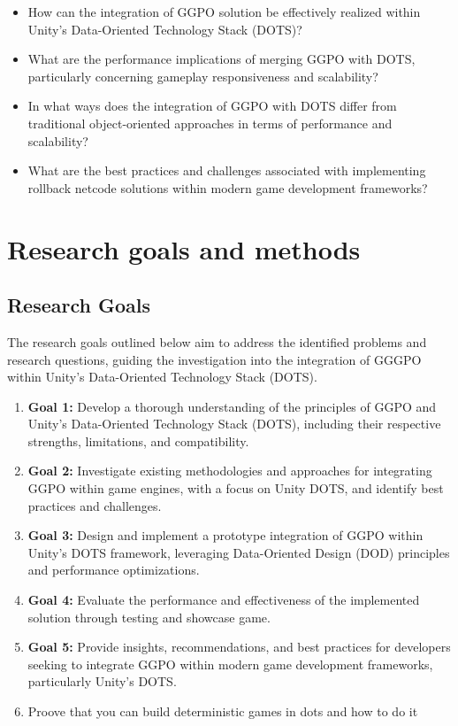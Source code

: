 \begin{itemize}
\item How can the integration of GGPO solution be effectively realized within Unity's Data-Oriented Technology Stack (DOTS)?
\item What are the performance implications of merging GGPO with DOTS, particularly concerning gameplay responsiveness and scalability?
\item In what ways does the integration of GGPO with DOTS differ from traditional object-oriented approaches in terms of performance and scalability?
\item What are the best practices and challenges associated with implementing rollback netcode solutions within modern game development frameworks?
\end{itemize}


\section{Research goals and methods}

\subsection{Research Goals}

The research goals outlined below aim to address the identified problems and research questions, guiding the investigation into the integration of GGGPO within Unity's Data-Oriented Technology Stack (DOTS).

\begin{enumerate}
    \item \textbf{Goal 1:} Develop a thorough understanding of the principles of GGPO and Unity's Data-Oriented Technology Stack (DOTS), including their respective strengths, limitations, and compatibility.
    
    \item \textbf{Goal 2:} Investigate existing methodologies and approaches for integrating GGPO within game engines, with a focus on Unity DOTS, and identify best practices and challenges.
    
    \item \textbf{Goal 3:} Design and implement a prototype integration of GGPO within Unity's DOTS framework, leveraging Data-Oriented Design (DOD) principles and performance optimizations.
    
    \item \textbf{Goal 4:} Evaluate the performance and effectiveness of the implemented solution through testing and showcase game.
    
    \item \textbf{Goal 5:} Provide insights, recommendations, and best practices for developers seeking to integrate GGPO within modern game development frameworks, particularly Unity's DOTS.
    
    \item Proove that you can build deterministic games in dots and how to do it
\end{enumerate}


